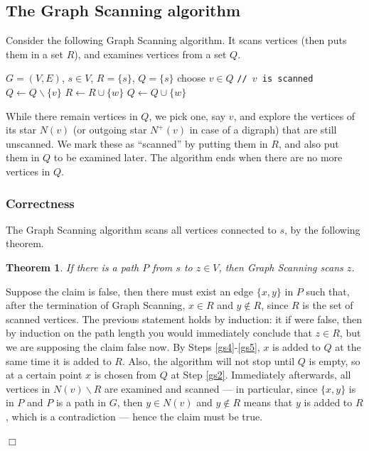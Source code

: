 \documentclass[a4paper]{book}
\theoremstyle{changebreak}                %
\newtheorem{thm}[result]{Theorem}
\newenvironment{proof}
 {{\sl Proof.}\hspace*{1 ex}}%
 {{\nopagebreak\hspace*{\fill}$\Box$\par\vspace{12pt}}}
\begin{document}
\subsection{The {\sc Graph Scanning} algorithm}
Consider the following {\sc Graph Scanning} algorithm. It scans vertices (then puts them in a
set $R$), and examines vertices from a set $Q$.
\begin{algorithmic}[1]
\REQUIRE $G=(V,E)$, $s\in V$, $R=\{s\}$, $Q=\{s\}$
  \STATE choose $v\in Q$ {\tt // $v$ is scanned} \label{gs2}
  \STATE $Q\leftarrow Q\smallsetminus\{v\}$ \label{gs7}
   \label{gs3}
    \STATE $R\leftarrow R\cup\{w\}$ \label{gs4}
    \STATE $Q\leftarrow Q\cup\{w\}$ \label{gs5}
  \ENDFOR
\ENDWHILE
\end{algorithmic}
While there remain vertices in $Q$, we pick one, say $v$, and explore
the vertices of its star $N(v)$ (or outgoing star $N^+(v)$ in case of
a digraph) that are still unscanned. We mark these as ``scanned'' by
putting them in $R$, and also put them in $Q$ to be examined
later. The algorithm ends when there are no more vertices in $Q$.

\subsubsection{Correctness}

The {\sc Graph Scanning} algorithm scans all vertices connected to
$s$, by the following theorem.
\begin{thm}
If there is a path $P$ from $s$ to $z\in V$, then {\sc Graph Scanning}
scans $z$.
\label{thm:gphscn1}
\end{thm}
\begin{proof}
  Suppose the claim is false, then there must exist an
  edge $\{x,y\}$ in $P$ such that, after the termination
  of {\sc Graph Scanning}, $x\in R$ and $y\not\in R$, since $R$ is the
  set of scanned vertices. The previous statement holds by induction:
  it if were false, then by induction on the path
  length you would immediately conclude that $z\in
  R$, but we are supposing the claim false now. By Steps
  \ref{gs4}-\ref{gs5}, $x$ is added to $Q$ at the same time it is
  added to $R$. Also, the algorithm will not stop until $Q$ is empty,
  so at a certain point $x$ is chosen from $Q$ at Step
  \ref{gs2}. Immediately afterwards, all vertices in
  $N(v)\smallsetminus R$ are examined and scanned --- in particular,
  since $\{x,y\}$ is in $P$ and $P$ is a path in $G$, then $y\in N(v)$
  and $y\not\in R$ means that $y$ is added to $R$, which is a
  contradiction --- hence the claim must be true.
\end{proof}
\end{document}
